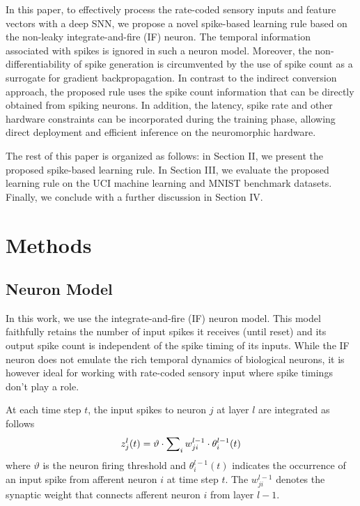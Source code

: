 \documentclass[conference]{IEEEtran}
\begin{document}
In this paper, to effectively process the rate-coded sensory inputs and feature vectors with a deep SNN, we propose a novel spike-based learning rule based on the non-leaky integrate-and-fire (IF) neuron. The temporal information associated with spikes is ignored in such a neuron model. Moreover, the non-differentiability of spike generation is circumvented by the use of spike count as a surrogate for gradient backpropagation. In contrast to the indirect conversion approach, the proposed rule uses the spike count information that can be directly obtained from spiking neurons. In addition, the latency, spike rate and other hardware constraints can be incorporated during the training phase, allowing direct deployment and efficient inference on the neuromorphic hardware.

The rest of this paper is organized as follows: in Section II, we present the proposed spike-based learning rule. In Section III, we evaluate the proposed learning rule on the UCI machine learning and MNIST benchmark datasets. Finally, we conclude with a further discussion in Section IV.

\vspace{5mm}
\section{Methods}
\label{ssec:Methods}
\subsection{Neuron Model}
In this work, we use the integrate-and-fire (IF) neuron model. This model faithfully retains the number of input spikes it receives (until reset) and its output spike count is independent of the spike timing of its inputs. While the IF neuron does not emulate the rich temporal dynamics of biological neurons, it is however ideal for working with rate-coded sensory input where spike timings don't play a role. 

At each time step $t$, the input spikes to neuron $j$ at layer $l$ are integrated as follows
\begin{equation}
z_j^l(t) = \vartheta  \cdot \sum\nolimits_i {w_{ji}^{l - 1} \cdot \theta _i^{l - 1}} (t)\\
\end{equation}
where $\vartheta$ is the neuron firing threshold and $\theta _i^{l - 1}(t)$ indicates the occurrence of an input spike from afferent neuron $i$ at time step $t$. The $w_{ji}^{l - 1}$ denotes the synaptic weight that connects afferent neuron $i$ from layer $l-1$.
\end{document}
